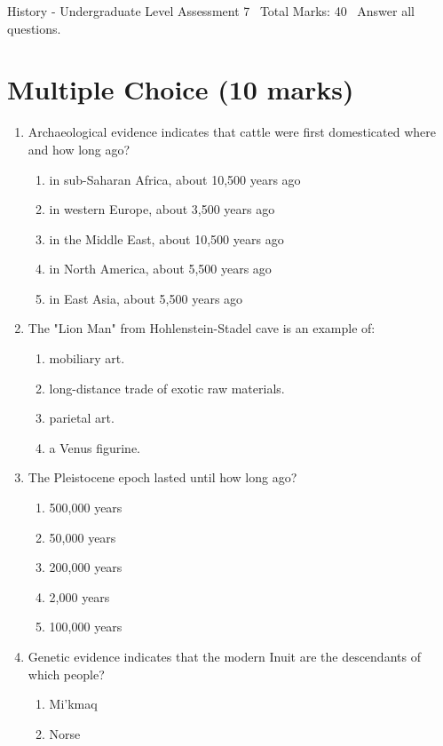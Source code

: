 \documentclass[12pt]{article}
\begin{document}
\begin{center}
History - Undergraduate Level Assessment 7 \
Total Marks: 40 \
Answer all questions.
\end{center}

\section*{Multiple Choice (10 marks)}
\begin{enumerate}[label=\arabic*.]
\item Archaeological evidence indicates that cattle were first domesticated where and how long ago?
\begin{enumerate}[label=(\alph*)]
    \item in sub-Saharan Africa, about 10,500 years ago
    \item in western Europe, about 3,500 years ago
    \item in the Middle East, about 10,500 years ago
    \item in North America, about 5,500 years ago
    \item in East Asia, about 5,500 years ago
\end{enumerate}
\item The "Lion Man" from Hohlenstein-Stadel cave is an example of:
\begin{enumerate}[label=(\alph*)]
    \item mobiliary art.
    \item long-distance trade of exotic raw materials.
    \item parietal art.
    \item a Venus figurine.
\end{enumerate}
\item The Pleistocene epoch lasted until how long ago?
\begin{enumerate}[label=(\alph*)]
    \item 500,000 years
    \item 50,000 years
    \item 200,000 years
    \item 2,000 years
    \item 100,000 years
\end{enumerate}
\item Genetic evidence indicates that the modern Inuit are the descendants of which people?
\begin{enumerate}[label=(\alph*)]
    \item Mi'kmaq
    \item Norse

\end{enumerate}
\end{enumerate}
\end{document}
